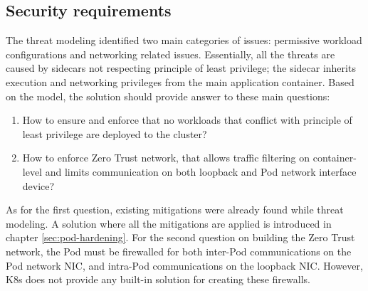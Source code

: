 \documentclass[english, 12pt, a4paper, sci, utf8, a-2b, online]{aaltothesis}
\begin{document}
\subsection{Security requirements}

The threat modeling identified two main categories of issues: permissive workload configurations and networking related issues. Essentially, all the threats are caused by sidecars not respecting principle of least privilege; the sidecar inherits execution and networking privileges from the main application container. Based on the model, the solution should provide answer to these main questions:


\begin{enumerate}
  \item How to ensure and enforce that no workloads that conflict with principle of least privilege are deployed to the cluster?
  \item How to enforce Zero Trust network, that allows traffic filtering on container-level and limits communication on both loopback and Pod network interface device?
\end{enumerate}


As for the first question, existing mitigations were already found while threat modeling. A solution where all the mitigations are applied is introduced in chapter \ref{sec:pod-hardening}. For the second question on building the Zero Trust network, the Pod must be firewalled for both inter-Pod communications on the Pod network NIC, and intra-Pod communications on the loopback NIC. However, K8s does not provide any built-in solution for creating these firewalls.
\end{document}
